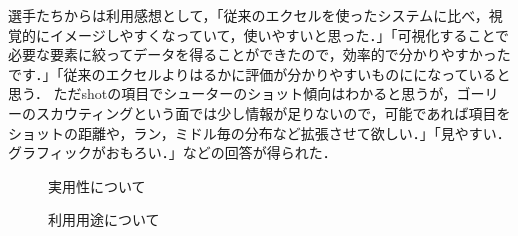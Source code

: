 \documentclass[sotsuron]{kuee}
\begin{document}
			選手たちからは利用感想として，「従来のエクセルを使ったシステムに比べ，視覚的にイメージしやすくなっていて，使いやすいと思った．」「可視化することで必要な要素に絞ってデータを得ることができたので，効率的で分かりやすかったです．」「従来のエクセルよりはるかに評価が分かりやすいものにになっていると思う． ただshotの項目でシューターのショット傾向はわかると思うが，ゴーリーのスカウティングという面では少し情報が足りないので，可能であれば項目をショットの距離や，ラン，ミドル毎の分布など拡張させて欲しい．」「見やすい．グラフィックがおもろい．」などの回答が得られた．
			\begin{figure}
				\begin{center}
				\end{center}
				\caption{実用性について}
		  		\label{fig:result06}
			\end{figure}
			\begin{figure}
				\begin{center}
				\end{center}
				\caption{利用用途について}
		  		\label{fig:result07}
			\end{figure}
\end{document}
